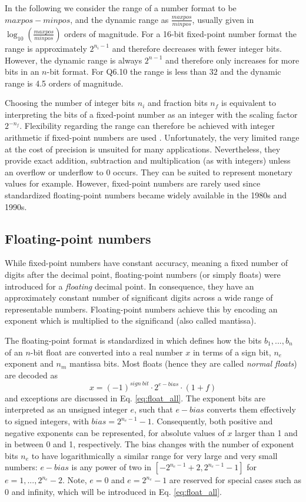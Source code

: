 In the following we consider the range of a number format to be $maxpos-minpos$, and the dynamic range as
$\tfrac{maxpos}{minpos}$, usually given in $\log_{10}(\tfrac{maxpos}{minpos})$ orders of magnitude. For a 16-bit fixed-point
number format the range is approximately $2^{n_i-1}$ and therefore decreases with fewer integer bits.
However, the dynamic range is always $2^{n-1}$ and therefore only increases for more bits in an $n$-bit format. For Q6.10
the range is less than $32$ and the dynamic range is 4.5 orders of magnitude.

Choosing the number of integer bits $n_i$ and fraction bits $n_f$ is equivalent to interpreting the bits of a fixed-point number
as an integer with the scaling factor $2^{-n_f}$. Flexibility regarding the range can therefore be achieved with
integer arithmetic if fixed-point numbers are used \citep{Russell2017}. Unfortunately, the very limited range at the cost of precision 
is unsuited for many applications. Nevertheless, they provide exact addition, subtraction and multiplication (as with integers) unless an
overflow or underflow to 0 occurs. They can be suited to represent monetary values for example. However, fixed-point numbers
are rarely used since standardized floating-point numbers became widely available in the 1980s and 1990s.

\subsection{Floating-point numbers}
\label{sec:floats}

While fixed-point numbers have constant accuracy, meaning a fixed number of digits after the decimal point, floating-point
numbers (or simply floats) were introduced for a \emph{floating} decimal point. In consequence, they have an approximately constant
number of significant digits across a wide range of representable numbers. Floating-point numbers achieve this by
encoding an exponent which is multiplied to the significand (also called mantissa).

The floating-point format is standardized in \cite{IEEE1985,IEEE2008} which defines how the bits $b_1,...,b_n$ of an
$n$-bit float are converted into a real number $x$ in terms of a sign bit, $n_e$ exponent and $n_m$ mantissa bits.
Most floats (hence they are called \emph{normal floats}) are decoded as
\begin{equation}
x = (-1)^{sign~bit} \cdot 2^{e-bias} \cdot (1+f)
\label{eq:float}
\end{equation}
and exceptions are discussed in Eq. \ref{eq:float_all}. The exponent bits are interpreted as an unsigned integer $e$, such that $e-bias$ converts
them effectively to signed integers, with $bias = 2^{n_e-1}-1$. Consequently, both positive and negative exponents can be represented,
for absolute values of $x$ larger than 1 and in between 0 and 1, respectively. The bias changes with the number of exponent
bits $n_e$ to have logarithmically a similar range for very large and very small numbers: $e-bias$ is any power of two in
$[-2^{n_e-1}+2,2^{n_e-1}-1]$ for $e=1,...,2^{n_e}-2$. Note, $e=0$ and $e=2^{n_e}-1$ are reserved for special cases such as 0 and infinity,
which will be introduced in Eq. \ref{eq:float_all}.

